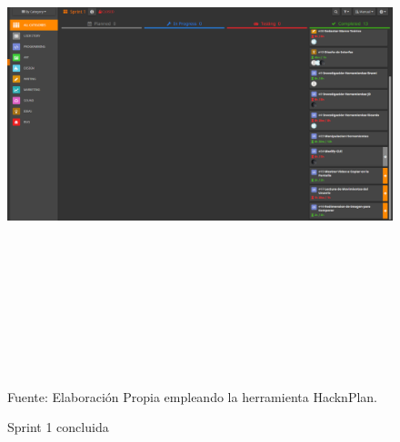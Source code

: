 \newpage
\begin{landscape}

\begin{figure}[t!]
	\centering
	\includegraphics[width=23cm,height=15cm,]{./Images/sprintexample2.png}
	\caption{Sprint 1 concluida}
	\footnotesize Fuente: Elaboración Propia empleando la herramienta HacknPlan.
	\label{sprintexample2}
\end{figure}


\end{landscape}
